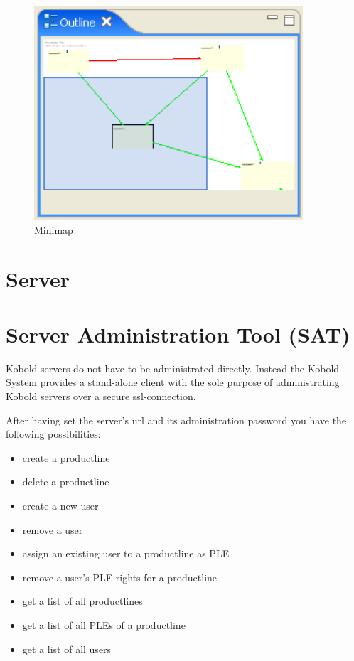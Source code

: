 \begin{figure}[h!]
\begin{center}
\includegraphics[width=10cm]{outline.png}
   \caption{Minimap}
\label{map}
\end{center}
\end{figure}\par




\section{Server}






\section{Server Administration Tool (SAT)}

Kobold servers do not have to be administrated directly. Instead the Kobold System 
provides a stand-alone client with the sole purpose of administrating Kobold servers 
over a secure ssl-connection. \par

After having set the server's url and its administration password you have the following 
possibilities:

\begin{itemize}
	\item create a productline
	\item delete a productline
	\item create a new user
	\item remove a user
	\item assign an existing user to a productline as PLE
	\item remove a user's PLE rights for a productline
	\item get a list of all productlines
	\item get a list of all PLEs of a productline
	\item get a list of all users
\end{itemize}


